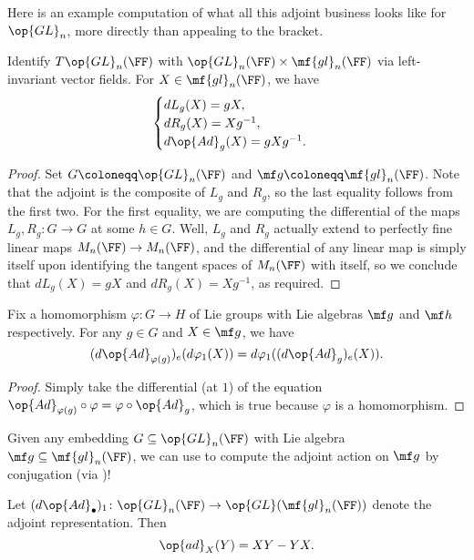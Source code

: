 \documentclass[../notes.tex]{subfiles}
\begin{document}
Here is an example computation of what all this adjoint business looks like for $\op{GL}_n$, more directly than appealing to the bracket.
\begin{lemma} \label{lem:adjoint-rep-gln}
	Identify $T\op{GL}_n(\FF)$ with $\op{GL}_n(\FF)\times\mf{gl}_n(\FF)$ via left-invariant vector fields. For $X\in\mf {gl}_n(\FF)$, we have
	\[\begin{cases}
		dL_g(X)=gX, \\
		dR_g(X)=Xg^{-1}, \\
		d\op{Ad}_g(X)=gXg^{-1}.
	\end{cases}\]
\end{lemma}
\begin{proof}
	Set $G\coloneqq\op{GL}_n(\FF)$ and $\mf g\coloneqq\mf{gl}_n(\FF)$. Note that the adjoint is the composite of $L_g$ and $R_g$, so the last equality follows from the first two. For the first equality, we are computing the differential of the maps $L_g,R_g\colon G\to G$ at some $h\in G$. Well, $L_g$ and $R_g$ actually extend to perfectly fine linear maps $M_n(\FF)\to M_n(\FF)$, and the differential of any linear map is simply itself upon identifying the tangent spaces of $M_n(\FF)$ with itself, so we conclude that $dL_g(X)=gX$ and $dR_g(X)=Xg^{-1}$, as required.
\end{proof}
\begin{lemma} \label{lem:adjoint-hom}
	Fix a homomorphism $\varphi\colon G\to H$ of Lie groups with Lie algebras $\mf g$ and $\mf h$ respectively. For any $g\in G$ and $X\in\mf g$, we have
	\[(d{\op{Ad}_{\varphi(g)}})_e(d\varphi_1(X))=d\varphi_1((d{\op{Ad}_g})_e(X)).\]
\end{lemma}
\begin{proof}
	Simply take the differential (at $1$) of the equation ${\op{Ad}_{\varphi(g)}}\circ\varphi=\varphi\circ\op{Ad}_g$, which is true because $\varphi$ is a homomorphism.
\end{proof}
\begin{example}
	Given any embedding $G\subseteq\op{GL}_n(\FF)$ with Lie algebra $\mf g\subseteq\mf{gl}_n(\FF)$, we can use  to compute the adjoint action on $\mf g$ by conjugation (via )!
\end{example}
\begin{proposition} \label{lem:lie-adjoint-gln}
	Let $(d{\op{Ad}_\bullet})_1\colon\op{GL}_n(\FF)\to\op{GL}(\mf{gl}_n(\FF))$ denote the adjoint representation. Then
	\[\op{ad}_X(Y)=XY-YX.\]
\end{proposition}
\end{document}
